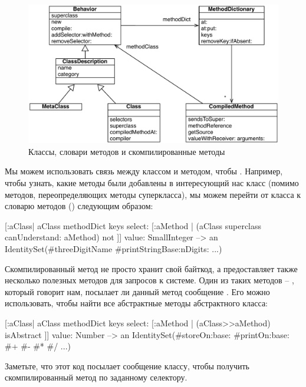 \documentclass[a4paper,10pt,twoside]{book}
\begin{document}
\begin{figure}[ht]\centering
	\includegraphics[width=\linewidth]{MethodsAsObjects}
	\caption{Классы, словари методов и скомпилированные методы\figlabel{MethodsAsObjects}}
\end{figure}

Мы можем использовать связь между классом и методом, чтобы .
Например, чтобы узнать, какие методы были добавлены в интересующий нас класс (помимо методов, переопределяющих методы суперкласса), мы можем перейти от класса к словарю методов () следующим образом:
\begin{code}{}
[:aClass| aClass methodDict keys select: [:aMethod |
  (aClass superclass canUnderstand: aMethod) not ]] value: SmallInteger
  --> an IdentitySet(#threeDigitName #printStringBase:nDigits: ...)
\end{code}

Скомпилированный метод не просто хранит свой байткод,
а предоставляет также несколько полезных методов для запросов к системе.
Один из таких методов -- , который говорит нам, посылает ли данный метод сообщение .
Его можно использовать, чтобы найти все абстрактные методы абстрактного класса:
\begin{code}{}
[:aClass| aClass methodDict keys select: [:aMethod |
  (aClass>>aMethod) isAbstract ]] value: Number
  --> an IdentitySet(#storeOn:base: #printOn:base: #+ #- #* #/ ...)
\end{code}
Заметьте, что этот код посылает сообщение \ct{>>} классу, чтобы получить скомпилированный метод по заданному селектору.
\end{document}
